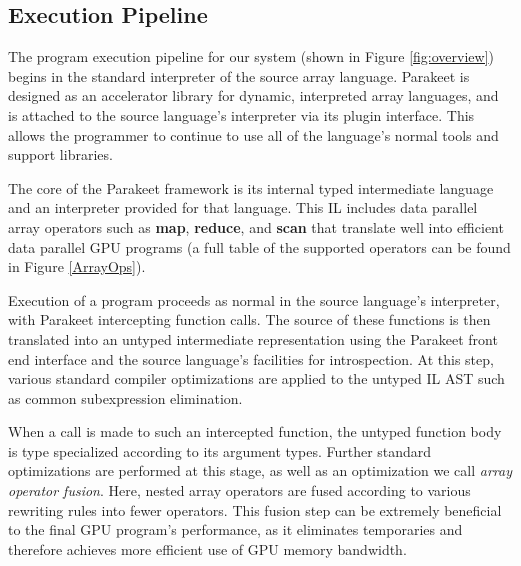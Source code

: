 \documentclass[preprint]{sigplanconf}
\begin{document}
\subsection{Execution Pipeline}
\label{executionpipeline}

The program execution pipeline for our system (shown in Figure \ref{fig:overview}) begins in the standard interpreter of the source array language.  Parakeet is designed as an accelerator library for dynamic, interpreted array languages, and is attached to the source language's interpreter via its plugin interface. This allows the programmer to continue to use all of the language's normal tools and support libraries.

The core of the Parakeet framework is its internal typed intermediate language and an interpreter provided for that language. This IL includes data parallel array operators such as \textbf{map}, \textbf{reduce}, and \textbf{scan} that translate well into efficient data parallel GPU programs (a full table of the supported operators can be found in Figure \ref{ArrayOps}).

Execution of a program proceeds as normal in the source language's interpreter, with Parakeet intercepting function calls.  The source of these functions is then translated into an untyped intermediate representation using the Parakeet front end interface and the source language's facilities for introspection. At this step, various standard compiler optimizations are applied to the untyped IL AST such as common subexpression elimination.

When a call is made to such an intercepted function, the untyped function body is type specialized according to its argument types.  Further standard optimizations are performed at this stage, as well as an optimization we call \emph{array operator fusion}.  Here, nested array operators are fused according to various rewriting rules into fewer operators. This fusion step can be extremely beneficial to the final GPU program's performance, as it eliminates temporaries and therefore achieves more efficient use of GPU memory bandwidth.
\end{document}
